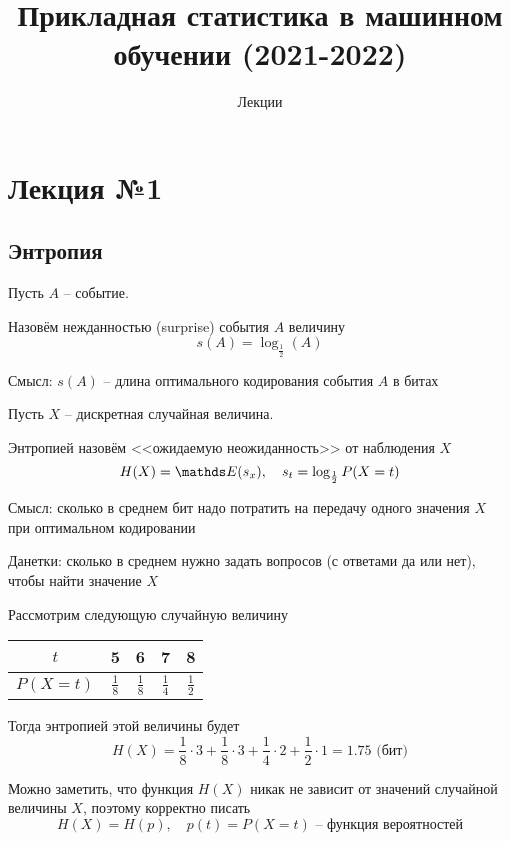 \documentclass{article}
\title{Прикладная статистика в машинном обучении (2021-2022)}
\author{Лекции}
\date{}
\begin{document}
\maketitle

\section{Лекция №1}

\subsection{Энтропия}

Пусть $A$ -- событие.

\begin{definition}
    Назовём нежданностью (surprise) события $A$ величину
    \[
        s(A) = \log_{\frac 12} (A)
    \]

    \footnotesize{
        Смысл: $s(A)$ -- длина оптимального кодирования события $A$ в битах
    }
\end{definition}

Пусть $X$ -- дискретная случайная величина. 

\begin{definition}
    Энтропией назовём <<ожидаемую неожиданность>> от наблюдения $X$
    \[
        H(X) = \E(s_x), \quad s_t = \log_{\frac 12} P(X = t)
    \]

    \footnotesize{
        Смысл: сколько в среднем бит надо потратить на передачу одного значения $X$ при оптимальном кодировании

        Данетки: сколько в среднем нужно задать вопросов (с ответами да или нет), чтобы найти значение $X$
    }
\end{definition}

\begin{example}
    Рассмотрим следующую случайную величину

    \begin{center}
        \begin{tabular}{|c|c|c|c|c|}
            \hline
            $t$        & 5          & 6          & 7          & 8          \\ \hline
            $P(X = t)$ & $\frac 18$ & $\frac 18$ & $\frac 14$ & $\frac 12$ \\ \hline
        \end{tabular}
    \end{center}

    Тогда энтропией этой величины будет
    \[
        H(X) = \frac 18 \cdot 3 + \frac 18 \cdot 3 + \frac 14 \cdot 2 + \frac 12 \cdot 1 = 1.75 \text{ (бит)}
    \]

    Можно заметить, что функция $H(X)$ никак не зависит от значений случайной величины $X$, поэтому корректно писать
    \[
        H(X) = H(p), \quad p(t) = P(X = t) \text{ -- функция вероятностей}   
    \]
\end{example}
\end{document}
